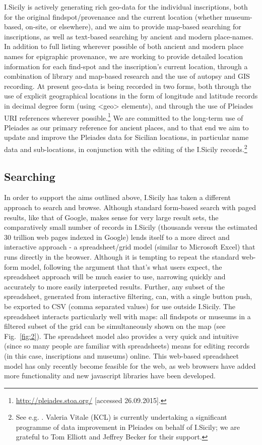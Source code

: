 \documentclass[amsthm,ebook]{saparticle}
\begin{document}
I.Sicily is actively generating rich geo-data for the individual inscriptions, both for the original findspot/provenance
and the current location (whether museum-based, on-site, or elsewhere), and we aim to provide map-based searching for
inscriptions, as well as text-based searching by ancient and modern place-names. In addition to full listing wherever
possible of both ancient and modern place names for epigraphic provenance, we are working to provide detailed location
information for each find-spot and the inscription’s current location, through a combination of library and map-based
research and the use of autopsy and GIS recording. At present geo-data is being recorded in two forms, both through the
use of explicit geographical locations in the form of longitude and latitude records in decimal degree form (using
{\textless}geo{\textgreater} elements), and through the use of Pleiades URI references wherever possible.\footnote{
\url{http://pleiades.stoa.org/} [accessed 26.09.2015].} We are committed to the long-term use of Pleiades as our primary
reference for ancient places, and to that end we aim to update and improve the Pleiades data for Sicilian locations, in
particular name data and sub-locations, in conjunction with the editing of the I.Sicily records.\footnote{ See e.g.
\citet{wilson_places:_2015}. Valeria Vitale (KCL) is currently undertaking a significant programme of data improvement in
Pleiades on behalf of I.Sicily; we are grateful to Tom Elliott and Jeffrey Becker for their support.}




\subsection{Searching}


In order to support the aims outlined above, I.Sicily has taken a different approach to search and browse. Although
standard form-based search with paged results, like that of Google, makes sense for very large result sets, the
comparatively small number of records in I.Sicily (thousands versus the estimated 30 trillion web pages indexed in
Google) lends itself to a more direct and interactive approach - a spreadsheet/grid model (similar to Microsoft Excel)
that runs directly in the browser. Although it is tempting to repeat the standard web-form model, following the
argument that that’s what users expect, the spreadsheet approach will be much easier to use, narrowing quickly and
accurately to more easily interpreted results. Further, any subset of the spreadsheet, generated from interactive
filtering, can, with a single button push, be exported to CSV (comma separated values) for use outside I.Sicily. The
spreadsheet interacts particularly well with maps: all findspots or museums in a filtered subset of the grid can be
simultaneously shown on the map (see Fig.~\ref{fig:2}). The spreadsheet model also provides a very quick and intuitive (since so
many people are familiar with spreadsheets) means for editing records (in this case, inscriptions and museums) online.
This web-based spreadsheet model has only recently become feasible for the web, as web browsers have added more
functionality and new javascript libraries have been developed.
\end{document}
